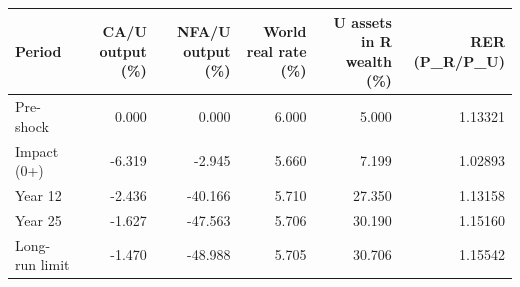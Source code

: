 \begin{table}[!ht]
\setlength\tabcolsep{0.425em}
\setlength\aboverulesep{0pt}
\setlength\belowrulesep{0.2em}
\centering
\begin{threeparttable}
\begin{tabular}{lrrrrr}
\toprule[0.1em]
\textbf{Period} & \textbf{CA/U output (\%)} & \textbf{NFA/U output (\%)} & \textbf{World real rate (\%)} & \textbf{U assets in R wealth (\%)} & \textbf{RER (P\_R/P\_U)} \\[0.2em]
\midrule[0.075em]
Pre-shock & 0.000 & 0.000 & 6.000 & 5.000 & 1.13321 \\[0.2em]
Impact (0+) & -6.319 & -2.945 & 5.660 & 7.199 & 1.02893 \\[0.2em]
Year 12 & -2.436 & -40.166 & 5.710 & 27.350 & 1.13158 \\[0.2em]
Year 25 & -1.627 & -47.563 & 5.706 & 30.190 & 1.15160 \\[0.2em]
Long-run limit & -1.470 & -48.988 & 5.705 & 30.706 & 1.15542 \\[0.2em]
\bottomrule[0.1em]
\end{tabular}
\end{threeparttable}
\end{table}
